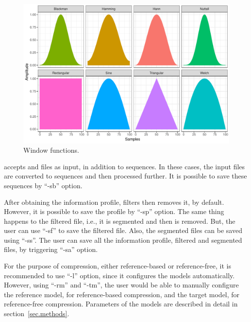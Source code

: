\begin{figure}[!h]
  \centering
  \includegraphics[width=.95\linewidth]{filters.pdf}
  \caption{Window functions.}
  \label{fig.filters}
\end{figure}

\smashpp accepts \fasta and \fastq files as input, in addition to sequences. In these cases, the input files are converted to sequences and then processed further. It is possible to save these sequences by ``-sb'' option.

After obtaining the information profile, \smashpp filters then removes it, by default. However, it is possible to save the profile by ``-sp'' option. The same thing happens to the filtered file, i.e., it is segmented and then is removed. But, the user can use ``-sf'' to save the filtered file. Also, the segmented files can be saved using ``-ss''. The user can save all the information profile, filtered and segmented files, by triggering ``-sa'' option.

For the purpose of compression, either reference-based or reference-free, it is recommended to use ``-l'' option, since it configures the models automatically. However, using ``-rm'' and ``-tm'', the user would be able to manually configure the reference model, for reference-based compression, and the target model, for reference-free compression. Parameters of the models are described in detail in section~\ref{sec.methods}.

